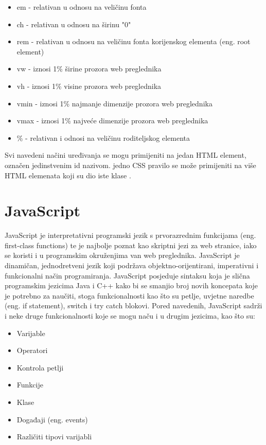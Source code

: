 \documentclass[12pt, oneside, onecolumn]{book}
\begin{document}
{\begin{itemize}
\item em - relativan u odnosu na veličinu fonta
\item ch - relativan u odnosu na širinu "0"
\item rem - relativan u odnosu na veličinu fonta korijenskog elementa (eng. root element)
\item vw - iznosi 1\% širine prozora web preglednika
\item vh - iznosi 1\% visine prozora web preglednika
\item vmin - iznosi 1\% najmanje dimenzije prozora web preglednika
\item vmax - iznosi 1\% najveće dimenzije prozora web preglednika
\item \% - relativan i odnosi na veličinu roditeljskog elementa
\end{itemize}

Svi navedeni načini uređivanja se mogu primijeniti na jedan HTML element, označen jedinstvenim id nazivom. jedno CSS pravilo se može primijeniti na više HTML elemenata koji su dio iste klase \cite{css_tut}.

\section{JavaScript}
JavaScript je interpretativni programski jezik s prvorazrednim funkcijama (eng. first-class functions) te je najbolje poznat kao skriptni jezi za web stranice, iako se koristi i u programskim okruženjima van web preglednika. JavaScript je dinamičan, jednodretveni jezik koji podržava objektno-orijentirani, imperativni i funkcionalni način programiranja. JavaScript posjeduje sintaksu koja je slična programskim jezicima Java i C++ kako bi se smanjio broj novih koncepata koje je potrebno za naučiti, stoga funkcionalnosti kao što su petlje, uvjetne naredbe (eng. if statement), switch i try catch blokovi. Pored navedenih, JavaScript sadrži i neke druge funkcionalnosti koje se mogu naču i u drugim jezicima, kao što su:

\begin{itemize}
\item Varijable
\item Operatori
\item Kontrola petlji 
\item Funkcije
\item Klase
\item Događaji (eng. events)
\item Različiti tipovi varijabli
\end{itemize}

}
\end{document}
